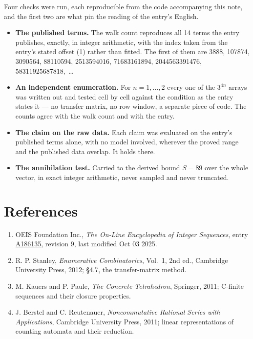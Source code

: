 \documentclass[11pt]{article}
\theoremstyle{definition}
\begin{document}
Four checks were run, each reproducible from the code accompanying this note, and the first two are what pin the reading of the entry's English.

\begin{itemize}

\item {\bfseries The published terms.} The walk count reproduces all 14 terms the entry publishes, exactly, in integer arithmetic, with the index taken from the entry's stated offset (1) rather than fitted. The first of them are 3888, 107874, 3090564, 88110594, 2513594016, 71683161894, 2044563391476, 58311925687818,~\dots

\item {\bfseries An independent enumeration.} For $n = 1,\dots,2$ every one of the $3^{4n}$ arrays was written out and tested cell by cell against the condition as the entry states it --- no transfer matrix, no row window, a separate piece of code. The counts agree with the walk count and with the entry.

\item {\bfseries The claim on the raw data.} Each claim was evaluated on the entry's published terms alone, with no model involved, wherever the proved range and the published data overlap. It holds there.

\item {\bfseries The annihilation test.} Carried to the derived bound $S = 89$ over the whole vector, in exact integer arithmetic, never sampled and never truncated.

\end{itemize}

\section{References}

\begin{enumerate}

\item OEIS Foundation Inc., \emph{The On-Line Encyclopedia of Integer Sequences}, entry \href{https://oeis.org/A186135}{A186135}, revision 9, last modified Oct 03 2025.

\item R. P. Stanley, \emph{Enumerative Combinatorics}, Vol.~1, 2nd ed., Cambridge University Press, 2012; \S4.7, the transfer-matrix method.

\item M. Kauers and P. Paule, \emph{The Concrete Tetrahedron}, Springer, 2011; C-finite sequences and their closure properties.

\item J. Berstel and C. Reutenauer, \emph{Noncommutative Rational Series with Applications}, Cambridge University Press, 2011; linear representations of counting automata and their reduction.

\end{enumerate}
\end{document}
